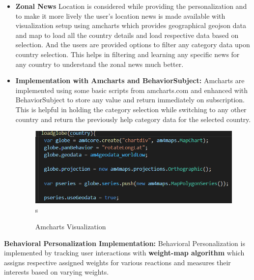 \begin{itemize}
     

 \item \textbf{Zonal News}\newline
Location is considered while providing the personalization and to make it more lively the user's location news is made available with visualization setup using amcharts which provides geographical geojson data and map to load all the country details and load respective data based on selection. 
And the users are provided options to filter any category data upon country selection. This helps in filtering and learning any specific news for any country to understand the zonal news much better.

 \item \textbf{Implementation with Amcharts and BehaviorSubject:}\newline
Amcharts are implemented using some basic scripts from amcharts.com and enhanced with BehaviorSubject to store any value and  return immediately on subscription.
This is helpful in holding the category selection while switching to any other country and return the previously help category data for the selected country.

  
\begin{figure}[h!]
     \begin{center}
    \includegraphics[width = \linewidth]{images/amchartsglobe.PNG}s 
  \end{center}
\centering \caption{Amcharts Visualization}
\end{figure}
 \end{itemize}
 
 
\textbf{Behavioral Personalization Implementation: }\newline
Behavioral Personalization is implemented by tracking user interactions with \textbf{weight-map algorithm} which assigns respective assigned weights for various reactions and measures their interests based on varying weights. \newline

